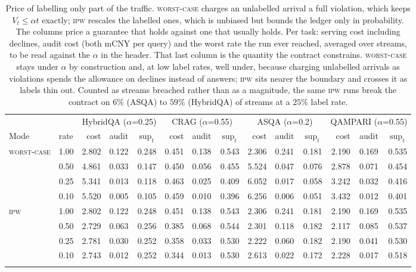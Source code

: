 \begin{table}[t]
\centering
\caption{Price of labelling only part of the traffic. \textsc{worst-case} charges an unlabelled arrival a full violation, which keeps $V_t\le\alpha t$ exactly; \textsc{ipw} rescales the labelled ones, which is unbiased but bounds the ledger only in probability. The columns price a guarantee that holds against one that usually holds. Per task: serving cost including declines, audit cost (both mCNY per query) and the worst rate the run ever reached, averaged over streams, to be read against the $\alpha$ in the header. That last column is the quantity the contract constrains. \textsc{worst-case} stays under $\alpha$ by construction and, at low label rates, well under, because charging unlabelled arrivals as violations spends the allowance on declines instead of answers; \textsc{ipw} sits nearer the boundary and crosses it as labels thin out. Counted as streams breached rather than as a magnitude, the same \textsc{ipw} runs break the contract on $6\%$ (ASQA) to $59\%$ (HybridQA) of streams at a $25\%$ label rate.}
\label{tab:audit}
\small
\setlength{\tabcolsep}{4pt}
\begin{tabular}{llrrrrrrrrrrrr}
\toprule
 & & \multicolumn{3}{c}{HybridQA ($\alpha$=0.25)} & \multicolumn{3}{c}{CRAG ($\alpha$=0.55)} & \multicolumn{3}{c}{ASQA ($\alpha$=0.2)} & \multicolumn{3}{c}{QAMPARI ($\alpha$=0.55)} \\
\cmidrule(lr){3-5}\cmidrule(lr){6-8}\cmidrule(lr){9-11}\cmidrule(lr){12-14}
Mode & rate & cost & audit & $\sup_t$ & cost & audit & $\sup_t$ & cost & audit & $\sup_t$ & cost & audit & $\sup_t$ \\
\midrule
\textsc{worst-case} & 1.00 & 2.802 & 0.122 & 0.248 & 0.451 & 0.138 & 0.543 & 2.306 & 0.241 & 0.181 & 2.190 & 0.169 & 0.535 \\
 & 0.50 & 4.861 & 0.033 & 0.147 & 0.450 & 0.056 & 0.455 & 5.524 & 0.047 & 0.076 & 2.878 & 0.071 & 0.454 \\
 & 0.25 & 5.341 & 0.013 & 0.118 & 0.463 & 0.025 & 0.409 & 6.052 & 0.017 & 0.058 & 3.242 & 0.032 & 0.416 \\
 & 0.10 & 5.520 & 0.005 & 0.105 & 0.459 & 0.010 & 0.396 & 6.256 & 0.006 & 0.051 & 3.432 & 0.012 & 0.401 \\
\addlinespace[2pt]
\textsc{ipw} & 1.00 & 2.802 & 0.122 & 0.248 & 0.451 & 0.138 & 0.543 & 2.306 & 0.241 & 0.181 & 2.190 & 0.169 & 0.535 \\
 & 0.50 & 2.729 & 0.063 & 0.256 & 0.385 & 0.068 & 0.544 & 2.301 & 0.118 & 0.182 & 2.117 & 0.085 & 0.537 \\
 & 0.25 & 2.781 & 0.030 & 0.252 & 0.358 & 0.033 & 0.530 & 2.222 & 0.060 & 0.182 & 2.190 & 0.041 & 0.530 \\
 & 0.10 & 2.743 & 0.012 & 0.252 & 0.344 & 0.013 & 0.530 & 2.613 & 0.022 & 0.172 & 2.228 & 0.017 & 0.518 \\
\addlinespace[2pt]
\bottomrule
\end{tabular}
\end{table}
